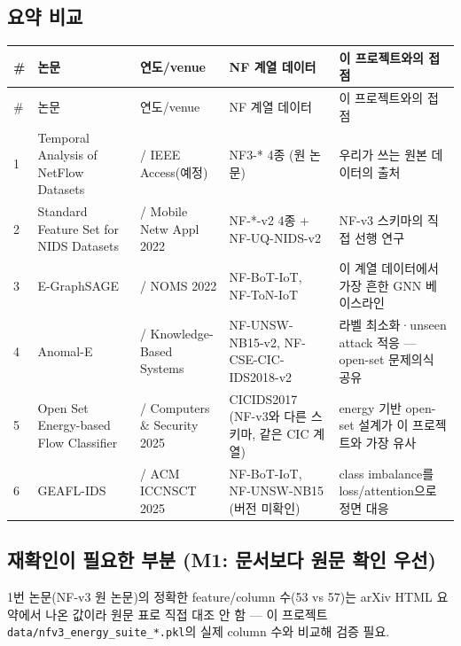 \subsection{요약 비교}
\begingroup
\footnotesize
\begin{longtable}{>{\raggedleft\arraybackslash}p{}>{\raggedright\arraybackslash}p{}>{\raggedright\arraybackslash}p{}>{\raggedright\arraybackslash}p{}>{\raggedright\arraybackslash}p{}}
\toprule
\# & 논문 & 연도/\allowbreak{}venue & NF 계열 데이터 & 이 프로젝트와의 접점 \\ \midrule
\endfirsthead
\# & 논문 & 연도/\allowbreak{}venue & NF 계열 데이터 & 이 프로젝트와의 접점 \\ \midrule
\endhead
{}1 & Temporal Analysis of NetFlow Datasets & 2025 /\allowbreak{} IEEE Access(예정) & NF3-* 4종 (원 논문) & 우리가 쓰는 원본 데이터의 출처 \\
{}2 & Standard Feature Set for NIDS Datasets & 2021 /\allowbreak{} Mobile Netw Appl 2022 & NF-*-v2 4종 +\allowbreak{} NF-UQ-NIDS-v2 & NF-v3 스키마의 직접 선행 연구 \\
{}3 & E-GraphSAGE & 2021 /\allowbreak{} NOMS 2022 & NF-BoT-IoT, NF-ToN-IoT & 이 계열 데이터에서 가장 흔한 GNN 베이스라인 \\
{}4 & Anomal-E & 2022 /\allowbreak{} Knowledge-Based Systems & NF-UNSW-NB15-v2, NF-CSE-CIC-IDS2018-v2 & 라벨 최소화·unseen attack 적응 — open-set 문제의식 공유 \\
{}5 & Open Set Energy-based Flow Classifier & 2021 /\allowbreak{} Computers \& Security 2025 & CICIDS2017 (NF-v3와 다른 스키마, 같은 CIC 계열) & energy 기반 open-set 설계가 이 프로젝트와 가장 유사 \\
{}6 & GEAFL-IDS & 2025 /\allowbreak{} ACM ICCNSCT 2025 & NF-BoT-IoT, NF-UNSW-NB15 (버전 미확인) & class imbalance를 loss/\allowbreak{}attention으로 정면 대응 \\
\bottomrule
\end{longtable}
\endgroup
\subsection{재확인이 필요한 부분 (M1: 문서보다 원문 확인 우선)}
\par\noindent \textbullet\enspace 1번 논문(NF-v3 원 논문)의 정확한 feature/\allowbreak{}column 수(53 vs 57)는 arXiv HTML 요약에서 나온 값이라 원문 표로 직접 대조 안 함 — 이 프로젝트 \texttt{data/\allowbreak{}\allowbreak{}nfv\allowbreak{}3\_\allowbreak{}\allowbreak{}energy\allowbreak{}\_\allowbreak{}\allowbreak{}suite\_\allowbreak{}\allowbreak{}*\allowbreak{}.\allowbreak{}pkl}의 실제 column 수와 비교해 검증 필요.


